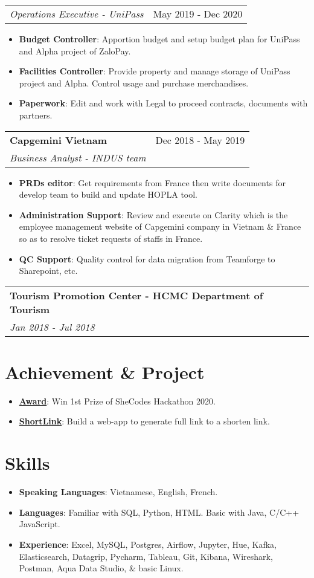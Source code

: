 \documentclass[letterpaper,11pt]{article}
\makeatletter
\newcommand{\resumeItem}[2]{
  \item\small{
    \textbf{#1}{: #2 \vspace{-2pt}}
  }
}
\newcommand{\resumeSubheading}[4]{
  \vspace{-1pt}
  \item
    \begin{tabular*}{0.97\textwidth}{l@{\extracolsep{\fill}}r}
      \textbf{#1} & #2 \\
      \textit{\small#3} & \textit{\small #4} \\
    \end{tabular*}\vspace{-5pt}
}
\newcommand{\resumeSubheadingNoTitle}[2]{
  \vspace{-1pt}
    \begin{tabular*}{0.97\textwidth}{l@{\extracolsep{\fill}}r}
      \textit{\small#1} & #2 \\
    \end{tabular*}\vspace{-5pt}
}
\newcommand{\resumeSubItem}[2]{\resumeItem{#1}{#2}\vspace{-4pt}}
\newcommand{\resumeSubHeadingListStart}{\begin{itemize}[leftmargin=*]}
\newcommand{\resumeSubHeadingListEnd}{\end{itemize}}
\newcommand{\resumeItemListStart}{\begin{itemize}}
\newcommand{\resumeItemListEnd}{\end{itemize}\vspace{-5pt}}
\makeatother
\begin{document}
    \resumeSubheadingNoTitle
      {Operations Executive - UniPass}{May 2019 - Dec 2020}
      \resumeItemListStart
        \resumeItem{Budget Controller}
          {Apportion budget and setup budget plan for UniPass and Alpha project of ZaloPay.} 
        \resumeItem{Facilities Controller}
          {Provide property and manage storage of UniPass project and Alpha. Control usage and purchase merchandises.}
        \resumeItem{Paperwork}
          {Edit and work with Legal to proceed contracts, documents with partners. }
      \resumeItemListEnd
      
    \resumeSubheading
      {Capgemini Vietnam}{Dec 2018 - May 2019}
      {Business Analyst - INDUS team}{}
      \resumeItemListStart
        \resumeItem{PRDs editor}
          {Get requirements from France then write documents for develop team to build and update HOPLA tool.} 
        \resumeItem{Administration Support}
            {Review and execute on Clarity which is the employee management website of Capgemini company in Vietnam \& France so as to resolve ticket requests of staffs in France. }
        \resumeItem{QC Support}    
            {Quality control for data migration from Teamforge to Sharepoint, etc. }
      \resumeItemListEnd


    \resumeSubheading
      {Tourism Promotion Center - HCMC Department of Tourism}{}{Jan 2018 - Jul 2018}
  \resumeSubHeadingListEnd
  
  
\section{Achievement \& Project}
  \resumeSubHeadingListStart 
    \resumeSubItem{\href{}{Award}}
      {Win 1st Prize of SheCodes Hackathon 2020. }
    \resumeSubItem{\href{https://github.com/tuyen-nnt/shortenLink}{ShortLink}}
      {Build a web-app to generate full link to a shorten link.}
\resumeSubHeadingListEnd

  
\section{Skills}
  \resumeSubHeadingListStart
    \resumeSubItem{Speaking Languages}
      {Vietnamese, English, French.}
    \resumeSubItem{Languages}
      {Familiar with SQL, Python, HTML. Basic with Java, C/C++ JavaScript.}
    \resumeSubItem{Experience}
      {Excel, MySQL, Postgres, Airflow, Jupyter, Hue, Kafka, Elasticsearch, Datagrip, Pycharm, Tableau, Git, Kibana, Wireshark, Postman, Aqua Data Studio, \& basic Linux.}
\resumeSubHeadingListEnd
  
\end{document}
